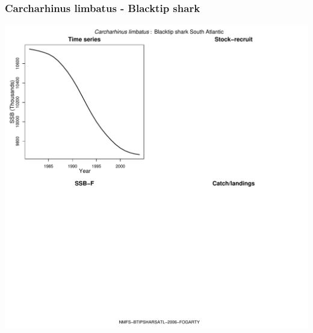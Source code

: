 \subsubsection{Carcharhinus limbatus - Blacktip shark}
\begin{center}
\includegraphics[width=1.2\textwidth]{../R/figures/NMFS-BTIPSHARSATL-2006-FOGARTY.pdf}
\end{center}

